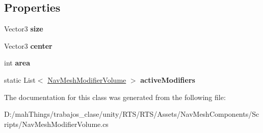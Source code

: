 \subsection*{Properties}
\begin{DoxyCompactItemize}
\item 
\mbox{\label{class_unity_engine_1_1_a_i_1_1_nav_mesh_modifier_volume_a6d41ab19eb04de52b3e13c42ba47e11e}} 
Vector3 {\bfseries size}
\item 
\mbox{\label{class_unity_engine_1_1_a_i_1_1_nav_mesh_modifier_volume_a4714dbf648538abbc3a495084a434b55}} 
Vector3 {\bfseries center}
\item 
\mbox{\label{class_unity_engine_1_1_a_i_1_1_nav_mesh_modifier_volume_a3daa3d1b155e4f6a0dc7b34d571317a7}} 
int {\bfseries area}
\item 
\mbox{\label{class_unity_engine_1_1_a_i_1_1_nav_mesh_modifier_volume_a11e8c223005f2d6a0ddee83eff2e412b}} 
static List$<$ \mbox{\hyperlink{class_unity_engine_1_1_a_i_1_1_nav_mesh_modifier_volume}{Nav\+Mesh\+Modifier\+Volume}} $>$ {\bfseries active\+Modifiers}
\end{DoxyCompactItemize}


The documentation for this class was generated from the following file\+:\begin{DoxyCompactItemize}
\item 
D\+:/mah\+Things/trabajos\+\_\+clase/unity/\+R\+T\+S/\+R\+T\+S/\+Assets/\+Nav\+Mesh\+Components/\+Scripts/Nav\+Mesh\+Modifier\+Volume.\+cs\end{DoxyCompactItemize}
